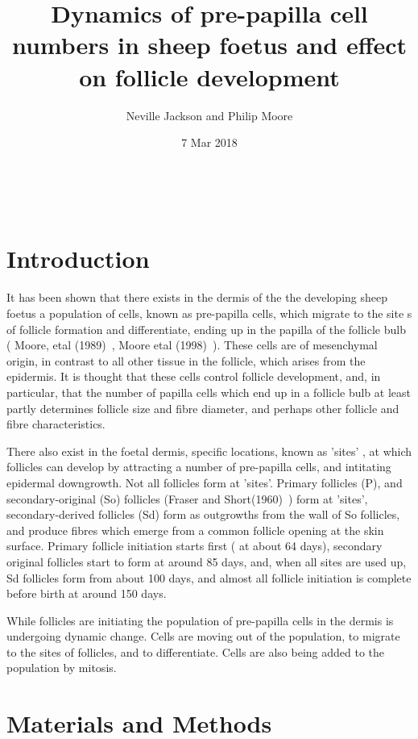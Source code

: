 \documentclass[titlepage]{article}  %
\title{Dynamics of pre-papilla cell numbers in sheep foetus and effect on follicle development}
\author{Neville Jackson and Philip Moore}
\date{7 Mar 2018}
\begin{document}
 


 
\maketitle      
\tableofcontents

$\newcommand{\E}{\mathrm{E}}$
$\newcommand{\Var}{\mathrm{Var}}$
$\newcommand{\Cov}{\mathrm{Cov}}$ 
$\newcommand{\SD}{\mathrm{SD}}$ 

\clearpage
\section{Introduction} 
It has been shown that there  exists in the dermis of the the developing sheep foetus a population of cells, known as pre-papilla cells, which migrate to the site s of follicle formation and differentiate, ending up in the papilla of the follicle bulb ( Moore, etal (1989)~\cite{moor:89}, Moore etal (1998)~\cite{moor:98}). These cells are of mesenchymal origin, in contrast to all other tissue in the follicle, which arises from the epidermis. It is thought that these cells control follicle development, and, in particular, that the number of papilla cells which end up in a follicle bulb  at least partly determines follicle size and fibre diameter, and perhaps other follicle and fibre characteristics.

There also exist in the foetal dermis, specific locations, known as 'sites' , at which follicles can develop by attracting a number of pre-papilla cells, and intitating epidermal downgrowth. Not all follicles form at 'sites'. Primary follicles (P), and secondary-original (So) follicles (Fraser and Short(1960)~\cite{fras:60}) form at 'sites', secondary-derived follicles (Sd) form as outgrowths from the wall of So follicles, and produce fibres which emerge from a common follicle opening at the skin surface. Primary follicle initiation starts first ( at about 64 days), secondary original follicles start to form at around 85 days, and, when all sites are used up, Sd follicles form from about 100 days, and almost all follicle initiation is complete before birth at around 150 days. 

While follicles are initiating the population of pre-papilla cells in the dermis is undergoing dynamic change. Cells are moving out of the population, to migrate to the sites of follicles, and to differentiate. Cells are also being added to the population by mitosis.

\section{Materials and Methods}
\end{document}
